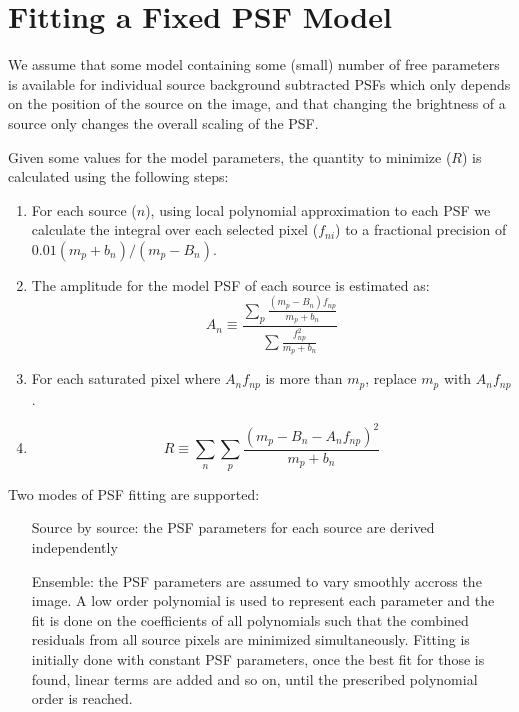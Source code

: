 \documentclass{article}
\begin{document}
\section{Fitting a Fixed PSF Model}

We assume that some model containing some (small) number of free parameters
is available for individual source background subtracted PSFs which only
depends on the position of the source on the image, and that changing the
brightness of a source only changes the overall scaling of the PSF.

Given some values for the model parameters, the quantity to minimize ($R$) is
calculated using the following steps:

\begin{enumerate}
	\item For each source ($n$), using local polynomial approximation to each
		PSF we calculate the integral over each selected pixel ($f_{ni}$) to
		a fractional precision of $0.01(m_p+b_n)/(m_p-B_n)$.
	\item The amplitude for the model PSF of each source is estimated as:
		\begin{displaymath}
			A_n\equiv\frac{\sum_p \frac{(m_p-B_n) f_{np}}{m_p+b_n}}{
			\sum\frac{f_{np}^2}{m_p+b_n}}
		\end{displaymath}
	\item For each saturated pixel where $A_nf_{np}$ is more than $m_p$, replace
		$m_p$ with $A_nf_{np}$.
	\item 
		\begin{displaymath}
			R\equiv\sum_n \sum_p\frac{\left(m_p-B_n-A_nf_{np}\right)^2}{m_p+b_n}
		\end{displaymath}
\end{enumerate}

Two modes of PSF fitting are supported:
%
\begin{itemize}
%
	\item[Source by source:] the PSF parameters for each source are derived
		independently
%
	\item[Ensemble:] the PSF parameters are assumed to vary smoothly accross
		the image. A low order polynomial is used to represent each parameter
		and the fit is done on the coefficients of all polynomials such that
		the combined residuals from all source pixels are minimized
		simultaneously. Fitting is initially done with constant PSF
		parameters, once the best fit for those is found, linear terms are
		added and so on, until the prescribed polynomial order is reached.
\end{itemize}
\end{document}
